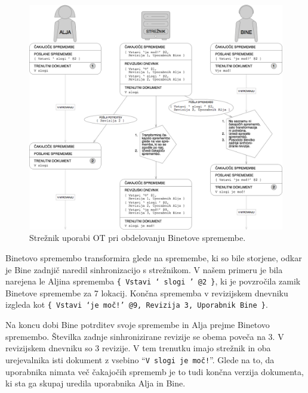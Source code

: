 \documentclass[a4paper, 12pt, twoside]{book}
\begin{document}
\begin{figure}[placement h]
\begin{center}
\includegraphics[width=14cm]{pc5.png}
\end{center}
\caption{Strežnik uporabi OT pri obdelovanju Binetove spremembe.}
\label{pc5}
\end{figure}

Binetovo spremembo transformira glede na spremembe, ki so bile storjene, odkar je Bine zadnjič naredil sinhronizacijo s strežnikom. V našem primeru je bila narejena le Aljina sprememba {\tt \{ Vstavi ‘ slogi ’ @2 \}}, ki je povzročila zamik Binetove spremembe za 7 lokacij. Končna sprememba v revizijskem dnevniku izgleda kot {\tt \{ Vstavi ‘je moč!’ @9, Revizija 3, Uporabnik Bine \}}.

\pagebreak

Na koncu dobi Bine potrditev svoje spremembe in Alja prejme Binetovo spremembo. Številka zadnje sinhronizirane revizije se obema poveča na 3. V revizijskem dnevniku so 3 revizije. V tem trenutku imajo strežnik in oba urejevalnika isti dokument z vsebino “{\tt V slogi je moč!}”. Glede na to, da uporabnika nimata več čakajočih sprememb je to tudi končna verzija dokumenta, ki sta ga skupaj uredila uporabnika Alja in Bine.
\end{document}
